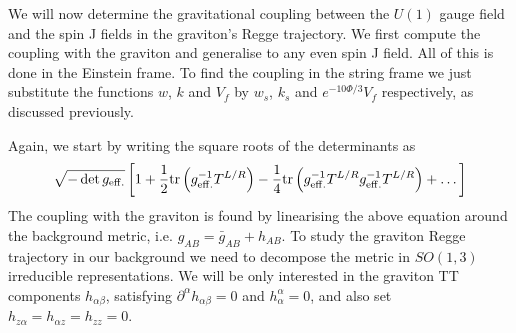 \documentclass[a4paper,12pt]{article}
\begin{document}
We will now determine the gravitational coupling between the $U(1)$ gauge field and the spin J fields in the graviton's Regge trajectory. We first compute the coupling with the graviton and generalise to any even spin J field. All of this is done in the Einstein frame. To find the coupling in the string frame we just substitute the functions $w$, $k$ and $V_f$ by $w_s$, $k_s$ and $e^{-10 \Phi / 3} V_f$ respectively, as discussed previously. 

Again, we start by writing the square roots of the determinants as
\begin{align}
	\sqrt{-\det g_{\rm{eff.}}} \left[ 1 + \frac{1}{2} \text{tr} \left( g^{-1}_{\rm{eff.}} T^{L/R}\right) - \frac{1}{4} \text{tr} \left( g^{-1}_{\rm{eff.}} T^{L/R} g^{-1}_{\rm{eff.}} T^{L/R} \right) + \dots \right]
\end{align}
The coupling with the graviton is found by linearising the above equation around the background metric, i.e. $g_{AB} = \bar{g}_{AB} + h_{AB}$. 
To study the graviton Regge trajectory in our background we need to decompose the metric in $SO(1,3)$ irreducible representations. 
We will be only interested in the graviton TT components $h_{\alpha \beta}$, satisfying $\partial^\alpha h_{\alpha \beta} = 0$ and $h^\alpha_\alpha = 0$, and also set $h_{z \alpha} = h_{\alpha z} = h_{zz} = 0$.
\end{document}
